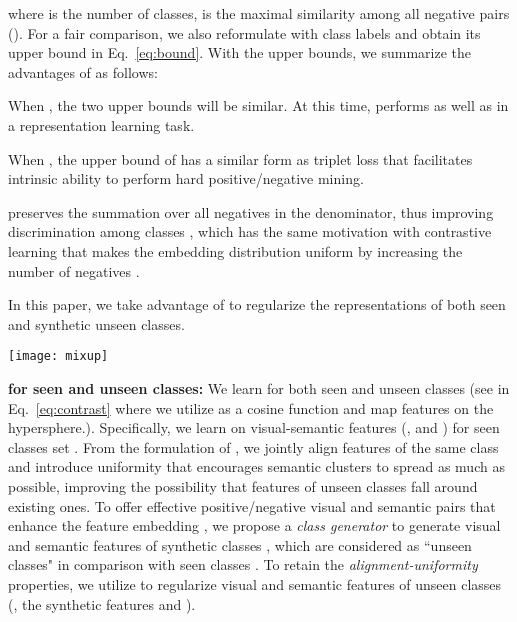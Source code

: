 \documentclass[10pt,twocolumn,letterpaper]{article}
\newlength\figsep\setlength{\figsep}{-2.8ex}
\begin{document}
where  is the number of classes,  is the maximal similarity among all negative pairs ().
For a fair comparison, we also reformulate  with class labels and obtain its upper bound in Eq.~\ref{eq:bound}.
With the upper bounds, we summarize the advantages of  as follows:
\begin{compactenum}
\item When , the two upper bounds will be similar. At this time,  performs as well as  in a representation learning task.
\item When , the upper bound of  has a similar form as triplet loss \cite{schroff2015facenet} that facilitates intrinsic ability to perform hard positive/negative mining.
\item  preserves the summation over all negatives in the denominator, thus improving discrimination among classes \cite{sohn2016improved}, which has the same motivation with contrastive learning that makes the embedding distribution uniform by increasing the number of negatives \cite{chen2020simple}.
\end{compactenum}
In this paper, we take advantage of  to regularize the representations of both seen and synthetic unseen classes. 

\begin{figure*}
    \centering
    \texttt{[image: mixup]}
    \caption{
    {\bf Illustration of Class Generator:}
    (a) Synthetic classes \protect\scalebox{1}{\color{red}{\textbullet}} are generated by linearly combining features of seen classes (\protect\scalebox{0.75}{} with colors);  means test classes.
    (b) Feature transformation w/ different  synthesizes semantics covering various size of regions.}
    \label{fig:generator}
    \vspace{\figsep}
\end{figure*}

{\bf  for seen and unseen classes:}
We learn  for both seen and unseen classes (see  in Eq.~\ref{eq:contrast} where we utilize  as a cosine function and map features on the hypersphere.).
Specifically, we learn  on visual-semantic features (\ie,  and ) for seen classes set .
From the formulation of , we jointly align features of the same class and introduce uniformity that encourages semantic clusters to spread as much as possible, improving the possibility that features of unseen classes fall around existing ones.
To offer effective positive/negative visual and semantic pairs that enhance the feature embedding \cite{zhu2021improving}, we propose a {\em class generator} to generate visual and semantic features of synthetic classes , which are considered as ``unseen classes" in comparison with seen classes .
To retain the {\em alignment-uniformity} properties, we utilize  to regularize visual and semantic features of  unseen classes (\ie, the synthetic features  and ).
\end{document}
